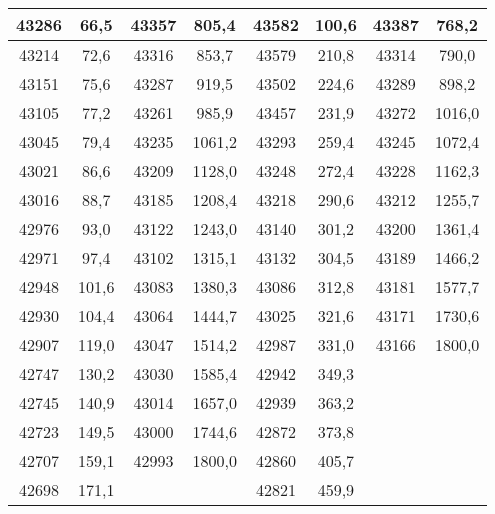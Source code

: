\documentclass[11pt]{article}
\begin{document}
{{\begin{tabular}{|c|c|c|c|c|c|c|c|}
            \hline 
            43286 & 66,5 & \multicolumn{1}{c|}{43357} & 805,4 & 43582 & 100,6 & \multicolumn{1}{c|}{43387} & \multicolumn{1}{c|}{768,2}\tabularnewline
            \hline 
            43214 & 72,6 & \multicolumn{1}{c|}{43316} & 853,7 & 43579 & 210,8 & \multicolumn{1}{c|}{43314} & \multicolumn{1}{c|}{790,0}\tabularnewline
            \hline 
            43151 & 75,6 & \multicolumn{1}{c|}{43287} & 919,5 & 43502 & 224,6 & \multicolumn{1}{c|}{43289} & \multicolumn{1}{c|}{898,2}\tabularnewline
            \hline 
            43105 & 77,2 & \multicolumn{1}{c|}{43261} & 985,9 & 43457 & 231,9 & \multicolumn{1}{c|}{43272} & \multicolumn{1}{c|}{1016,0}\tabularnewline
            \hline 
            43045 & 79,4 & \multicolumn{1}{c|}{43235} & 1061,2 & 43293 & 259,4 & \multicolumn{1}{c|}{43245} & \multicolumn{1}{c|}{1072,4}\tabularnewline
            \hline 
            43021 & 86,6 & \multicolumn{1}{c|}{43209} & 1128,0 & 43248 & 272,4 & \multicolumn{1}{c|}{43228} & \multicolumn{1}{c|}{1162,3}\tabularnewline
            \hline 
            43016 & 88,7 & \multicolumn{1}{c|}{43185} & 1208,4 & 43218 & 290,6 & \multicolumn{1}{c|}{43212} & \multicolumn{1}{c|}{1255,7}\tabularnewline
            \hline 
            42976 & 93,0 & \multicolumn{1}{c|}{43122} & 1243,0 & 43140 & 301,2 & \multicolumn{1}{c|}{43200} & \multicolumn{1}{c|}{1361,4}\tabularnewline
            \hline 
            42971 & 97,4 & \multicolumn{1}{c|}{43102} & 1315,1 & 43132 & 304,5 & \multicolumn{1}{c|}{43189} & \multicolumn{1}{c|}{1466,2}\tabularnewline
            \hline 
            42948 & 101,6 & \multicolumn{1}{c|}{43083} & 1380,3 & 43086 & 312,8 & \multicolumn{1}{c|}{43181} & \multicolumn{1}{c|}{1577,7}\tabularnewline
            \hline 
            42930 & 104,4 & \multicolumn{1}{c|}{43064} & 1444,7 & 43025 & 321,6 & \multicolumn{1}{c|}{43171} & \multicolumn{1}{c|}{1730,6}\tabularnewline
            \hline 
            42907 & 119,0 & \multicolumn{1}{c|}{43047} & 1514,2 & 42987 & 331,0 & \multicolumn{1}{c|}{43166} & \multicolumn{1}{c|}{1800,0}\tabularnewline
            \hline 
            42747 & 130,2 & \multicolumn{1}{c|}{43030} & 1585,4 & 42942 & 349,3 &  & \tabularnewline
            \cline{1-6} 
            42745 & 140,9 & \multicolumn{1}{c|}{43014} & 1657,0 & 42939 & 363,2 &  & \tabularnewline
            \cline{1-6} 
            42723 & 149,5 & \multicolumn{1}{c|}{43000} & 1744,6 & 42872 & 373,8 &  & \tabularnewline
            \cline{1-6} 
            42707 & 159,1 & \multicolumn{1}{c|}{42993} & 1800,0 & 42860 & 405,7 &  & \tabularnewline
            \cline{1-6} 
            42698 & 171,1 &  &  & 42821 & 459,9 &  & \tabularnewline

\end{tabular}}}
\end{document}
